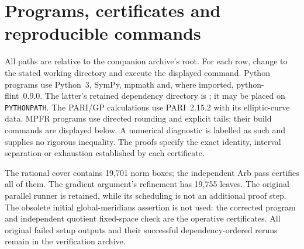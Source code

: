 \section{Programs, certificates and reproducible commands}
\label{app:I:programs}
All paths are relative to the companion archive's root. For each row, change
to the stated working directory and execute the displayed command. Python
programs use Python~3, SymPy, mpmath and, where imported, python-flint~0.9.0.
The latter's retained dependency directory is
; it may be placed on
\texttt{PYTHONPATH}. The PARI/GP calculations use PARI~2.15.2 with its
elliptic-curve data. MPFR programs use directed rounding and explicit tails;
their build commands are displayed below. A numerical diagnostic is labelled
as such and supplies no rigorous inequality. The proofs specify the exact
identity, interval separation or exhaustion established by each certificate.

The rational cover contains 19,701 norm boxes; the independent Arb pass
certifies all of them. The gradient argument's refinement has 19,755 leaves.
The original parallel runner is retained, while its scheduling is not an
additional proof step. The obsolete initial global-meridians assertion is
not used: the corrected program and independent quotient fixed-space check
are the operative certificates. All original failed setup outputs and their
successful dependency-ordered reruns remain in the verification archive.

